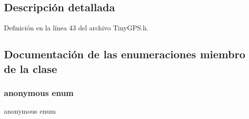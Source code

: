 \subsection{Descripción detallada}


Definición en la línea 43 del archivo Tiny\+G\+P\+S.\+h.



\subsection{Documentación de las enumeraciones miembro de la clase}
\mbox{\label{class_tiny_g_p_s_adefa8554723aa8802edacd6094366f6f}} 
\subsubsection{\texorpdfstring{anonymous enum}{anonymous enum}}
{\footnotesize\ttfamily anonymous enum}

